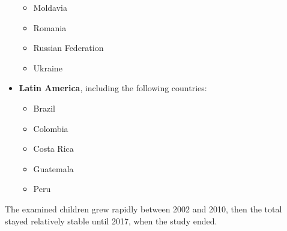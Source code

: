 \begin{itemize}
\begin{itemize}
    			\item Moldavia
    			\item Romania
    			\item Russian Federation
    			\item Ukraine
    		\end{itemize}
    \item \textbf{Latin America}, including the following countries:
    		\begin{itemize}
    			\item Brazil
    			\item Colombia
    			\item Costa Rica
    			\item Guatemala
    			\item Peru
    		\end{itemize}
\end{itemize}

The examined children grew rapidly between 2002 and 2010, then the total stayed relatively stable until 2017, when the study ended.

